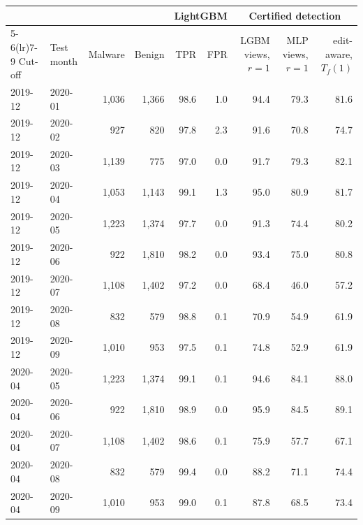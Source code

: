 \begin{tabular}{llrrrrrrr}
\toprule
 & & & & \multicolumn{2}{c}{LightGBM} & \multicolumn{3}{c}{Certified detection} \\
\cmidrule(lr){5-6}\cmidrule(lr){7-9}
Cut-off & Test month & Malware & Benign & TPR & FPR & LGBM views, $r=1$ & MLP views, $r=1$ & edit-aware, $T_f(1)$ \\
\midrule
2019-12 & 2020-01 & 1,036 & 1,366 & 98.6 & 1.0 & 94.4 & 79.3 & 81.6 \\
2019-12 & 2020-02 & 927 & 820 & 97.8 & 2.3 & 91.6 & 70.8 & 74.7 \\
2019-12 & 2020-03 & 1,139 & 775 & 97.0 & 0.0 & 91.7 & 79.3 & 82.1 \\
2019-12 & 2020-04 & 1,053 & 1,143 & 99.1 & 1.3 & 95.0 & 80.9 & 81.7 \\
2019-12 & 2020-05 & 1,223 & 1,374 & 97.7 & 0.0 & 91.3 & 74.4 & 80.2 \\
2019-12 & 2020-06 & 922 & 1,810 & 98.2 & 0.0 & 93.4 & 75.0 & 80.8 \\
2019-12 & 2020-07 & 1,108 & 1,402 & 97.2 & 0.0 & 68.4 & 46.0 & 57.2 \\
2019-12 & 2020-08 & 832 & 579 & 98.8 & 0.1 & 70.9 & 54.9 & 61.9 \\
2019-12 & 2020-09 & 1,010 & 953 & 97.5 & 0.1 & 74.8 & 52.9 & 61.9 \\
2020-04 & 2020-05 & 1,223 & 1,374 & 99.1 & 0.1 & 94.6 & 84.1 & 88.0 \\
2020-04 & 2020-06 & 922 & 1,810 & 98.9 & 0.0 & 95.9 & 84.5 & 89.1 \\
2020-04 & 2020-07 & 1,108 & 1,402 & 98.6 & 0.1 & 75.9 & 57.7 & 67.1 \\
2020-04 & 2020-08 & 832 & 579 & 99.4 & 0.0 & 88.2 & 71.1 & 74.4 \\
2020-04 & 2020-09 & 1,010 & 953 & 99.0 & 0.1 & 87.8 & 68.5 & 73.4 \\
\bottomrule
\end{tabular}
